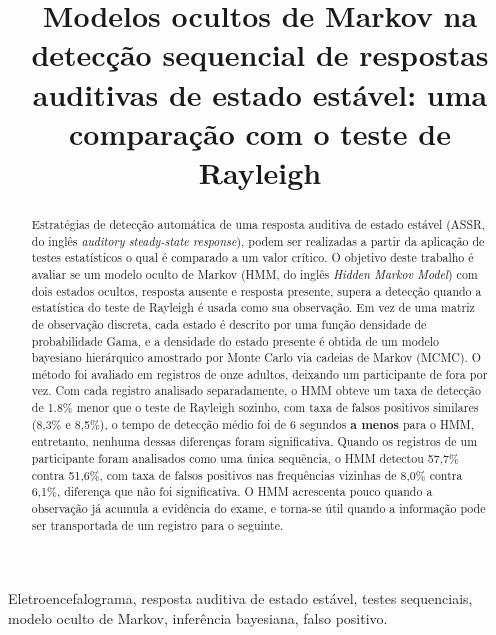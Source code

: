 \documentclass[conference]{IEEEtran}
\begin{document}
\title{Modelos ocultos de Markov na detecção sequencial de respostas auditivas de estado estável: uma comparação com o teste de Rayleigh}

\author{
}

\maketitle

\begin{abstract}
Estratégias de detecção automática de uma resposta auditiva de estado estável (ASSR, do inglês \textit{auditory steady-state response}), podem ser realizadas a partir da aplicação de testes estatísticos o qual é comparado a um valor crítico. O objetivo deste trabalho é avaliar se um modelo oculto de Markov (HMM, do inglês \textit{Hidden Markov Model}) com dois estados ocultos, resposta ausente e resposta presente, supera a detecção quando a estatística do teste de Rayleigh é usada como sua observação. Em vez de uma matriz de observação discreta, cada estado é descrito por uma função densidade de probabilidade Gama, e a densidade do estado presente é obtida de um modelo bayesiano hierárquico amostrado por Monte Carlo via cadeias de Markov (MCMC). O método foi avaliado em registros de onze adultos, deixando um participante de fora por vez. Com cada registro analisado separadamente, o HMM obteve um taxa de detecção de 1.8\% menor que o teste de Rayleigh sozinho, com taxa de falsos positivos similares (8,3\% e 8,5\%), o tempo de detecção médio foi de 6 segundos \textbf{a menos} para o HMM, entretanto, nenhuma dessas diferenças foram significativa. Quando os registros de um participante foram analisados como uma única sequência, o HMM detectou 57,7\% contra 51,6\%, com taxa de falsos positivos nas frequências vizinhas de 8,0\% contra 6,1\%, diferença que não foi significativa. O HMM acrescenta pouco quando a observação já acumula a evidência do exame, e torna-se útil quando a informação pode ser transportada de um registro para o seguinte.
\end{abstract}

\begin{IEEEkeywords}
Eletroencefalograma, resposta auditiva de estado estável, testes sequenciais, modelo oculto de Markov, inferência bayesiana, falso positivo.
\end{IEEEkeywords}
\end{document}
